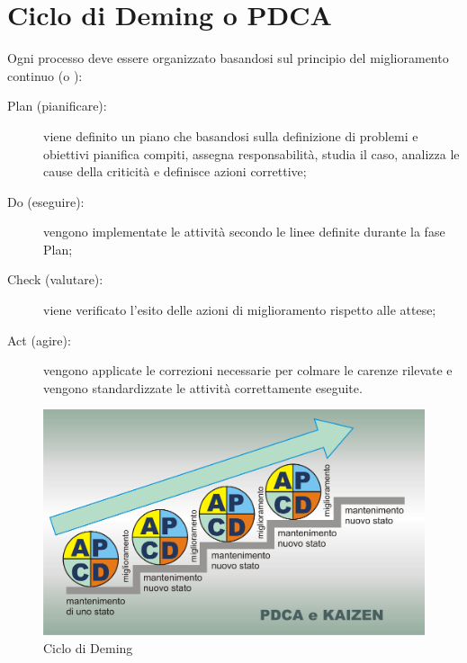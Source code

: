 \documentclass[NormeDiProgetto.tex]{subfiles}
\begin{document}
		
\chapter{Ciclo di Deming o PDCA}
Ogni processo deve essere organizzato basandosi sul principio del miglioramento continuo (o ):
\begin{description}
	\item [Plan (pianificare):] viene definito un piano che basandosi sulla definizione di problemi e obiettivi pianifica compiti, assegna responsabilità, studia il caso, analizza le cause della criticità e definisce azioni correttive; 
	\item [Do (eseguire):] vengono implementate le attività secondo le linee definite durante la fase Plan;
	\item [Check (valutare):] viene verificato l'esito delle azioni di miglioramento rispetto alle attese;
	\item [Act (agire):] vengono applicate le correzioni necessarie per colmare le carenze rilevate e vengono standardizzate le attività correttamente eseguite.
\end{description}

\begin{figure}[htbp]
	\begin{center}
		\includegraphics[width=0.7\linewidth]{PDCAkaizen}
		\caption[Ciclo di Deming]{Ciclo di Deming}
		\label{fig:pdca}
	\end{center}
\end{figure}
\end{document}
